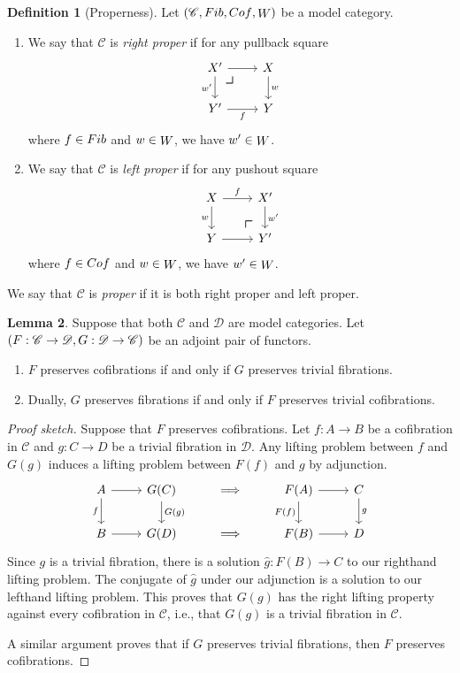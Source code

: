 \documentclass[10pt,letterpaper,cm]{nupset}
\theoremstyle{definition}
\newtheorem{definition}{Definition}[subsection]
\theoremstyle{theorem}
\newtheorem{lemma}[definition]{Lemma}
\theoremstyle{remark}
\newcommand{\0}{\mathbf{0}}
\newcommand{\1}{\mathbf{1}}
\newcommand{\2}{\mathbf{2}}
\renewcommand{\c}{\mathscr{C}}
\renewcommand{\d}{\mathscr{D}}
\DeclareMathOperator{\fib}{\mathnormal{Fib}}
\DeclareMathOperator{\cof}{\mathnormal{Cof}}
\DeclareMathOperator{\we}{\mathnormal{W}}
\newcommand{\be}{\begin{enumerate}}
\newcommand{\ee}{\end{enumerate}}
\begin{document}
\smallskip

\begin{definition}[Properness] Let $\mleft(\c, \fib, \cof, \we\mright)$ be a model category.
\be
\item We say that $\c$ is \textit{right proper} if for any pullback square
\[
\begin{tikzcd}
X' \arrow[r]
\arrow[dr, phantom, "\scalebox{1.5}{\color{black}$\lrcorner$}" , very near start, color=black]
 \arrow[d, "w'"'] & X \arrow[d, "w"] \\
Y' \arrow[r, "f"']            & Y               
\end{tikzcd}
\] where $f\in \fib$ and $w \in \we$, we have $w' \in \we$. 
\item We say that $\c$ is \textit{left proper} if for any pushout square
\[
\begin{tikzcd}
X \arrow[r, "f"]
 \arrow[dr, phantom, "\scalebox{1.5}{\color{black}$\ulcorner$}", very near end, color=black]
 \arrow[d, "w"'] & X' \arrow[d, "w'"] \\
Y \arrow[r]            & Y'               
\end{tikzcd}
\] where $f\in \cof$ and $w \in \we$, we have $w' \in \we$. 
\ee
We say that $\c$ is \textit{proper} if it is both right proper and left proper.
\end{definition}

\medskip

\begin{lemma}\label{trivcofp} Suppose that both $\c$ and $\d$ are model categories. Let $\mleft(F: \c \to \d, G :\d \to \c \mright)$ be an adjoint pair of functors.
\be[label=(\alph*)]
\item $F$ preserves cofibrations if and only if $G$ preserves trivial fibrations.
\item Dually, $G$ preserves fibrations if and only if $F$ preserves trivial cofibrations.
\ee 
\end{lemma}
\begin{proof}[Proof sketch] 
Suppose that $F$ preserves cofibrations. Let $f:A \to B$ be a cofibration in $\c$ and $g: C\to D$ be a trivial fibration in $\d$. Any lifting problem between $f$ and $G(g)$ induces a lifting problem between $F(f)$ and $g$ by adjunction.
\[
\begin{tikzcd}
A \arrow[r] \arrow[d, "f"'] & G(C) \arrow[d, "G(g)"] & \implies & F(A) \arrow[r] \arrow[d, "F(f)"'] & C \arrow[d, "g"] \\
B \arrow[r]                 & G(D)                   & \implies & F(B) \arrow[r]                    & D               
\end{tikzcd}
\] Since $g$ is a trivial fibration, there is a solution $\hat{g} : F(B) \to C$ to our righthand lifting problem. The conjugate of $\hat{g}$ under our adjunction is a solution to our lefthand lifting problem. This proves that $G(g)$ has the right lifting property against every cofibration in $\c$, i.e., that $G(g)$ is a trivial fibration in $\c$.

\smallskip 

A similar argument proves that if $G$ preserves trivial fibrations, then $F$ preserves cofibrations. 
\end{proof}
\end{document}
